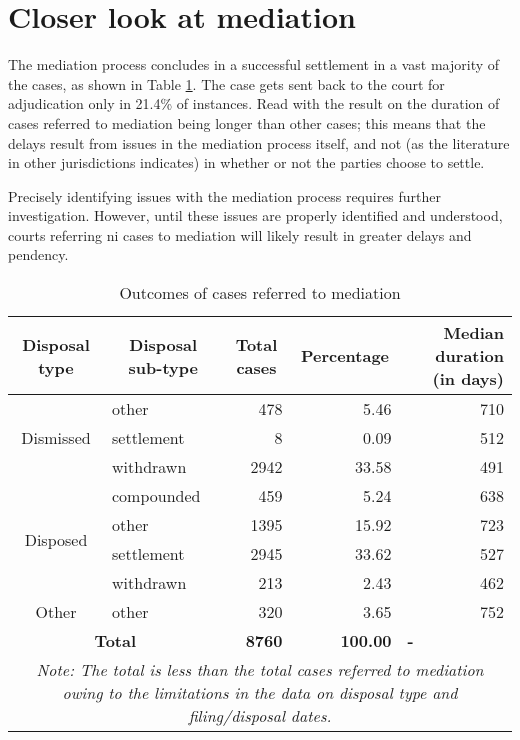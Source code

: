 \documentclass[11pt,a4paper]{article}
\begin{document}
\section{Closer look at mediation}
\label{sec:closer-look-at}

The mediation process concludes in a successful settlement in a vast majority of the cases, as shown in Table \ref{tab:mediation}. The case gets sent back to the court for adjudication only in 21.4\% of instances. Read with the result on the duration of cases referred to mediation being longer than other cases; this means that the delays result from issues in the mediation process itself, and not (as the literature in other jurisdictions indicates) in whether or not the parties choose to settle.

Precisely identifying issues with the mediation process requires further investigation. However, until these issues are properly identified and understood, courts referring \gls{ni} cases to mediation will likely result in greater delays and pendency.

{\footnotesize \begin{longtable}{@{}clrrr@{}}
 \caption{Outcomes of cases referred to mediation}
 \label{tab:mediation}\\
 \toprule
 \textbf{Disposal type} & \multicolumn{1}{c}{\textbf{Disposal sub-type}} & \multicolumn{1}{c}{\textbf{Total cases}} & \multicolumn{1}{c}{\textbf{Percentage}} & \multicolumn{1}{p{3cm}}{\textbf{Median duration (in days)}} \\
 \midrule \endhead
 \multirow{3}{*}{Dismissed} & other & 478 & 5.46 & 710 \\
 & settlement & 8 & 0.09 & 512 \\
 & withdrawn & 2942 & 33.58 & 491 \\
 \midrule
 \multirow{4}{*}{Disposed} & compounded & 459 & 5.24 & 638 \\
 & other & 1395 & 15.92 & 723 \\
 & settlement & 2945 & 33.62 & 527 \\
 & withdrawn & 213 & 2.43 & 462 \\
 \midrule
 Other & other & 320 & 3.65 & 752 \\
 \midrule
 \multicolumn{2}{c}{\textbf{Total}} & \textbf{8760} & \textbf{100.00} & \multicolumn{1}{l}{\textbf{-}} \\
 \bottomrule \multicolumn{5}{p{11cm}}{{\footnotesize \emph{Note:
 The total is less than the total cases referred to mediation owing to the limitations in the data on disposal type and filing/disposal dates.}}}
 \end{longtable}}
\end{document}
